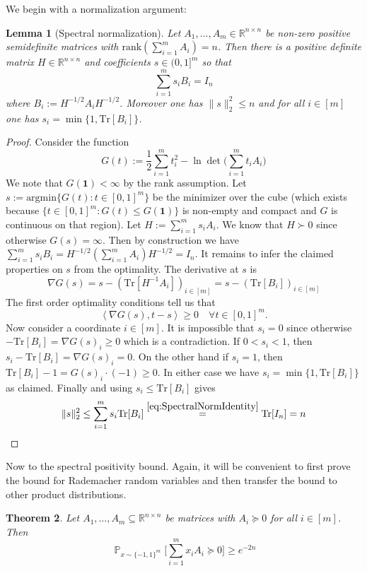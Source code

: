 \documentclass[12pt,english]{article}
\theoremstyle{theorem}
\newtheorem{theorem}{Theorem}
\newtheorem{lemma}[theorem]{Lemma}
\theoremstyle{remark}
\providecommand{\setR}{\mathbb{R}}
\renewcommand{\Tr}{\mathrm{Tr}}
\renewcommand{\Pr}{\mathop{\mathbb{P}}}
\begin{document}
We begin with a normalization argument:
\begin{lemma}[Spectral normalization] \label{lem:SpectralNormalization}
  Let $A_1,\ldots,A_m \in \setR^{n \times n}$ be non-zero positive semidefinite matrices with $\textrm{rank}(\sum_{i=1}^m A_i)=n$. Then there is a positive definite matrix $H \in \setR^{n \times n}$ and coefficients $s \in (0,1]^m$ so that
  \begin{equation} \label{eq:SpectralNormIdentity}
   \sum_{i=1}^m s_i B_i = I_n
  \end{equation}
  where $B_i := H^{-1/2}A_iH^{-1/2}$. Moreover one has $\|s\|_2^2 \leq n$ and for all $i \in [m]$ one has $s_i = \min\{1, \Tr[B_i]\}$. %
\end{lemma}
\begin{proof}
  Consider the function
  \[
  G(t) := \frac{1}{2}\sum_{i=1}^m t_i^2 - \ln \det\Big(\sum_{i=1}^m t_iA_i\Big)
\]
  We note that $G(\bm{1}) < \infty$ by the rank assumption.
  Let $s := \textrm{argmin}\{ G(t) : t \in [0,1]^m \}$ be the minimizer over the cube (which exists because $\{ t \in [0,1]^m : G(t) \leq G(\bm{1})\}$ is non-empty and compact and $G$ is continuous on that region). Let $H := \sum_{i=1}^m s_iA_i$. We know that $H \succ 0$ since otherwise $G(s) = \infty$. Then by construction we have  $\sum_{i=1}^m s_iB_i = H^{-1/2}(\sum_{i=1}^m A_i) H^{-1/2} = I_n$. It remains to infer the claimed properties on $s$ from the optimality.
  The derivative at $s$ is
  \[
    \nabla G(s) = s - (\Tr[H^{-1}A_i])_{i \in [m]} = s - (\Tr[B_i])_{i \in [m]}
  \]
  The first order optimality conditions tell us that
  \begin{equation} \label{eq:SpectralFirstOrderOptimality}
    \left<\nabla G(s),t-s\right> \geq 0 \quad  \forall t \in [0,1]^m.
  \end{equation}
  Now consider a coordinate $i \in [m]$. It is impossible that $s_i=0$ since otherwise
  $-\Tr[B_i]= \nabla G(s)_i \geq 0$ which is a contradiction. If $0<s_i<1$, then $s_i - \Tr[B_i] = \nabla G(s)_i = 0$.
  On the other hand if $s_i = 1$, then $\Tr[B_i]-1= G(s)_i \cdot (-1) \geq 0$. In either case
  we have $s_i = \min\{ 1,\Tr[B_i]\}$ as claimed. Finally  and using $s_i \leq \Tr[B_i]$ gives
  \[
  \|s\|_2^2 \leq \sum_{i=1}^m s_i \Tr[B_i] \stackrel{\eqref{eq:SpectralNormIdentity}}{=} \Tr[I_n] = n
  \]
\end{proof}
\fi
Now to the spectral positivity bound. Again, it will be convenient to first prove the bound for Rademacher random variables and then transfer the bound to other product distributions.
\begin{theorem} \label{thm:SpectralPositivityForRademachers}
  Let $A_1,\ldots,A_m \subseteq \setR^{n \times n}$ be matrices with $A_i \succeq 0$ for all $i \in [m]$. Then
  \[
 \Pr_{x \sim \{ -1,1\}^m}\Big[\sum_{i=1}^m x_iA_i \succeq 0\Big] \geq e^{-2n}
  \]
\end{theorem}
\end{document}

